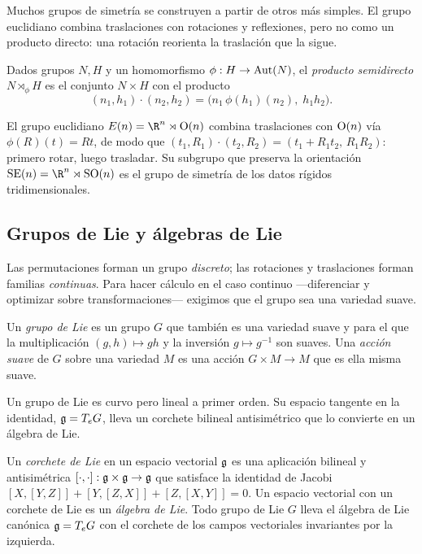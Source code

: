 Muchos grupos de simetr\'ia se construyen a partir de otros m\'as simples. El grupo
euclidiano combina traslaciones con rotaciones y reflexiones, pero no como un
producto directo: una rotaci\'on reorienta la traslaci\'on que la sigue.

\begin{definition}
\label{def:found:semidirect}
Dados grupos $N, H$ y un homomorfismo $\phi : H \to \operatorname{Aut}(N)$, el \emph{producto
semidirecto} $N \rtimes_\phi H$ es el conjunto $N \times H$ con el producto
\[
  (n_1, h_1)\cdot(n_2, h_2) = \bigl(n_1\,\phi(h_1)(n_2),\; h_1 h_2\bigr).
\]
\end{definition}

\begin{example}
\label{ex:found:euclidean}
El grupo euclidiano $E(n) = \R^n \rtimes \Orth(n)$ combina traslaciones con
$\operatorname{O}(n)$ v\'ia $\phi(R)(t) = Rt$, de modo que
$(t_1, R_1)\cdot(t_2, R_2) = (t_1 + R_1 t_2,\, R_1 R_2)$: primero rotar, luego
trasladar. Su subgrupo que preserva la orientaci\'on $\SE(n) = \R^n \rtimes \SO(n)$
es el grupo de simetr\'ia de los datos r\'igidos tridimensionales.
\end{example}

\subsection{Grupos de Lie y \'algebras de Lie}
\label{sec:found:lie-groups}

Las permutaciones forman un grupo \emph{discreto}; las rotaciones y traslaciones
forman familias \emph{continuas}. Para hacer c\'alculo en el caso continuo
---diferenciar y optimizar sobre transformaciones--- exigimos que el grupo sea una
variedad suave.

\begin{definition}
\label{def:found:liegroup}
Un \emph{grupo de Lie} es un grupo $G$ que tambi\'en es una variedad suave y para el
que la multiplicaci\'on $(g,h) \mapsto gh$ y la inversi\'on $g \mapsto g^{-1}$ son
suaves. Una \emph{acci\'on suave} de $G$ sobre una variedad $M$ es una acci\'on
$G \times M \to M$ que es ella misma suave.
\end{definition}

Un grupo de Lie es curvo pero lineal a primer orden. Su espacio tangente en la
identidad, $\mathfrak{g} = T_e G$, lleva un corchete bilineal antisim\'etrico que lo
convierte en un \'algebra de Lie.

\begin{definition}
\label{def:found:liealgebra}
Un \emph{corchete de Lie} en un espacio vectorial $\mathfrak{g}$ es una aplicaci\'on
bilineal y antisim\'etrica $[\cdot,\cdot] : \mathfrak{g} \times \mathfrak{g} \to \mathfrak{g}$ que
satisface la identidad de Jacobi $[X,[Y,Z]] + [Y,[Z,X]] + [Z,[X,Y]] = 0$. Un
espacio vectorial con un corchete de Lie es un \emph{\'algebra de Lie}. Todo grupo
de Lie $G$ lleva el \'algebra de Lie can\'onica $\mathfrak{g} = T_e G$ con el corchete de
los campos vectoriales invariantes por la izquierda.
\end{definition}

